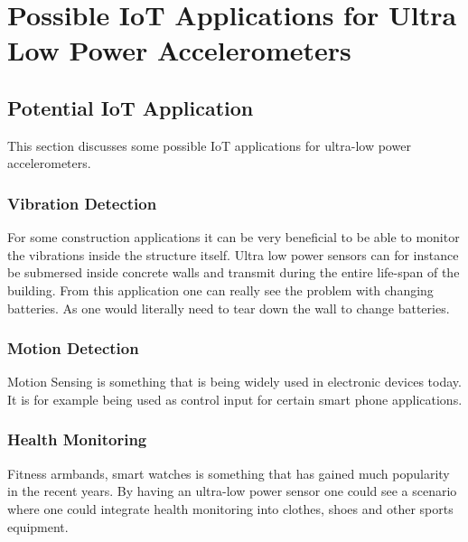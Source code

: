 \chapter{Possible IoT Applications for Ultra Low Power Accelerometers}

\section{Potential IoT Application}

This section discusses some possible IoT applications for ultra-low power accelerometers. 

\subsection{Vibration Detection}

For some construction applications it can be very beneficial to be able to monitor the vibrations inside the structure itself. Ultra low power sensors can for instance be submersed inside concrete walls and transmit during the entire life-span of the building. From this application one can really see the problem with changing batteries. As one would literally need to tear down the wall to change batteries. 

\subsection{Motion Detection}

Motion Sensing is something that is being widely used in electronic devices today. It is for example being used as control input for certain smart phone applications.

\subsection{Health Monitoring}

Fitness armbands, smart watches is something that has gained much popularity in the recent years. By having an ultra-low power sensor one could see a scenario where one could integrate health monitoring into clothes, shoes and other sports equipment. 
